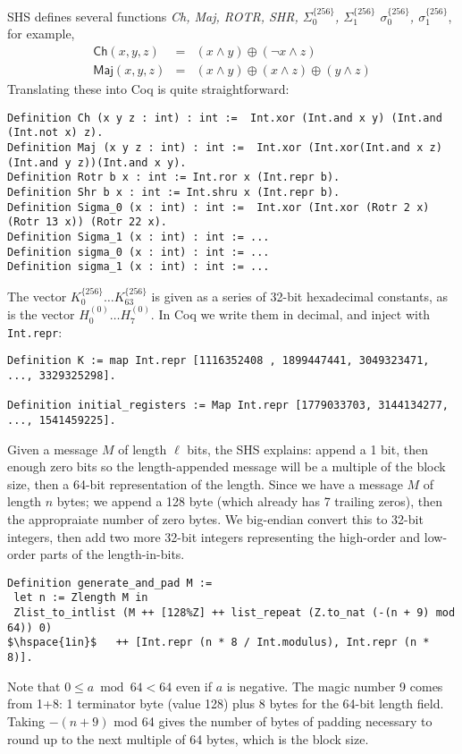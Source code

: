 \documentclass[prodmode,acmtoplas]{acmsmall}
\begin{document}
SHS defines several functions \emph{Ch, Maj, ROTR, SHR, 
$\Sigma_0^{\{256\}}$, $\Sigma_1^{\{256\}}$ $\sigma_0^{\{256\}}$, $\sigma_1^{\{256\}}$},
for example,
\[
\begin{array}{rcl}
\mathsf{Ch}(x,y,z) &=& (x\wedge y)\oplus(\neg x \wedge z) \\
\mathsf{Maj}(x,y,z) &=& (x\wedge y)\oplus(x \wedge z)\oplus (y \wedge z) 
\end{array}\]
Translating these into Coq is quite straightforward:
\begin{lstlisting}
Definition Ch (x y z : int) : int :=  Int.xor (Int.and x y) (Int.and (Int.not x) z).
Definition Maj (x y z : int) : int :=  Int.xor (Int.xor(Int.and x z)(Int.and y z))(Int.and x y).
Definition Rotr b x : int := Int.ror x (Int.repr b).
Definition Shr b x : int := Int.shru x (Int.repr b).
Definition Sigma_0 (x : int) : int :=  Int.xor (Int.xor (Rotr 2 x) (Rotr 13 x)) (Rotr 22 x).
Definition Sigma_1 (x : int) : int := ...
Definition sigma_0 (x : int) : int := ...
Definition sigma_1 (x : int) : int := ...
\end{lstlisting}

The vector $K_0^{\{256\}}\ldots K_{63}^{\{256\}}$
is given as a series of 32-bit hexadecimal constants,
as is the vector $H_0^{(0)}\ldots H_7^{(0)}$.
In Coq we write them in decimal, and inject with 
\lstinline{Int.repr}:
\begin{lstlisting}
Definition K := map Int.repr [1116352408 , 1899447441, 3049323471,  ..., 3329325298].

Definition initial_registers := Map Int.repr [1779033703, 3144134277, ..., 1541459225].
\end{lstlisting}

Given a message $M$ of length $\mathcal{\ell}$ bits,
the SHS explains: append a 1 bit, then enough zero bits
so the length-appended message will be a multiple of the
block size,
then a 64-bit representation of the length.
Since we have a message $M$ of length $n$ bytes;
we append a 128 byte (which already has 7 trailing zeros),
then the appropraiate number of zero bytes.
We big-endian convert this to 32-bit integers,
then add two more 32-bit integers representing the
high-order and low-order parts of the length-in-bits.
\begin{lstlisting}
Definition generate_and_pad M := 
 let n := Zlength M in
 Zlist_to_intlist (M ++ [128%Z] ++ list_repeat (Z.to_nat (-(n + 9) mod 64)) 0)
$\hspace{1in}$   ++ [Int.repr (n * 8 / Int.modulus), Int.repr (n * 8)].
\end{lstlisting}
Note that $0 \le a \bmod 64 < 64$ even if $a$ is negative.
The magic number 9 comes from 1+8: 1 terminator byte (value
128) plus 8 bytes for the 64-bit length field.
Taking $-(n+9)$ mod 64 gives the number of bytes of
padding necessary to round up to the next multiple of 64
bytes, which is the block size.
\end{document}
